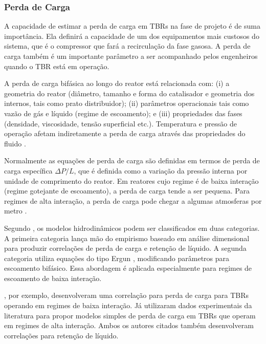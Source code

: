\subsubsection{Perda de Carga}
\label{sec:perdadecarga}

A capacidade de estimar a perda de carga em TBRs na fase de projeto é de suma
importância. Ela definirá a capacidade de um dos equipamentos mais custosos do
sistema, que é o compressor que fará a recirculação da fase gasosa. A perda de
carga também é um importante parâmetro a ser acompanhado pelos engenheiros quando o
TBR está em operação.

A perda de carga bifásica ao longo do reator está relacionada com: (i) a
geometria do reator (diâmetro, tamanho e forma do catalisador e geometria dos
internos, tais como prato distribuidor); (ii) parâmetros operacionais tais como
vazão de gás e líquido (regime de escoamento); e (iii) propriedades das fases
(densidade, viscosidade, tensão superficial etc.). Temperatura e pressão de operação afetam
indiretamente a perda de carga através das propriedades do fluido
\cite{Ranade2011}.

Normalmente as equações de perda de carga são definidas em termos de perda de
carga específica $\Delta P/L$, que é definida como a variação da pressão interna
por unidade de comprimento do reator. Em reatores cujo regime é de baixa
interação (regime gotejante de escoamento), a perda de carga tende a ser
pequena. Para regimes de alta interação, a perda de carga pode chegar a algumas
atmosferas por metro \cite{Benkrid1997}.


Segundo , os modelos hidrodinâmicos podem ser
classificados em duas categorias. A primeira categoria lança mão do empirismo
baseado em análise dimensional para produzir correlações de perda de carga e
retenção de líquido. A segunda categoria utiliza equações do tipo Ergun
, modificando parâmetros para escoamento bifásico.
Essa abordagem é aplicada especialmente para regimes de escoamento de baixa
interação.

, por exemplo, desenvolveram uma correlação para perda
de carga para TBRs operando em regimes de baixa interação. Já
 utilizaram dados experimentais  da literatura para
propor modelos simples de perda de carga em TBRs que operam em regimes de alta
interação. Ambos os autores citados também desenvolveram
correlações para retenção de líquido.

